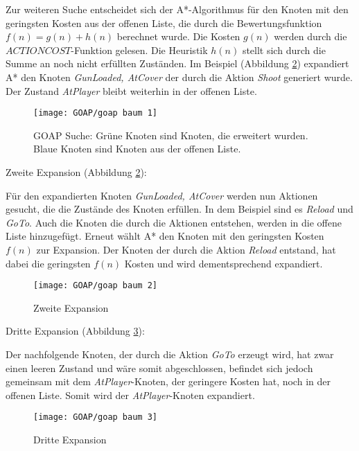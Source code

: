 Zur weiteren Suche entscheidet sich der A*-Algorithmus f\"{u}r den Knoten mit den geringsten Kosten aus der offenen Liste, die durch die Bewertungsfunktion $f(n) = g(n) + h(n)$ berechnet wurde. Die Kosten $g(n)$ werden durch die $\textit{ACTIONCOST}$-Funktion gelesen. Die Heuristik $h(n)$ stellt sich durch die Summe an noch nicht erf\"{u}llten Zust\"{a}nden. Im Beispiel (Abbildung \ref{fig:goap2}) expandiert A* den Knoten \textit{GunLoaded, AtCover} der durch die Aktion \textit{Shoot} generiert wurde. Der Zustand \textit{AtPlayer} bleibt weiterhin in der offenen Liste.


\begin{figure}[h]
  \centering
  \texttt{[image: GOAP/goap baum 1]}
	\captionsetup{justification=justified, format=plain}
  \caption{GOAP Suche: Gr\"{u}ne Knoten sind Knoten, die erweitert wurden. Blaue Knoten sind Knoten aus der offenen Liste.}
  \label{fig:goap1}
\end{figure}

\clearpage

Zweite Expansion (Abbildung \ref{fig:goap2}):

F\"{u}r den expandierten Knoten \textit{GunLoaded, AtCover} werden nun Aktionen gesucht, die die Zust\"{a}nde des Knoten erf\"{u}llen. In dem Beispiel sind es \textit{Reload} und \textit{GoTo}. Auch die Knoten die durch die Aktionen entstehen, werden in die offene Liste hinzugef\"{u}gt. Erneut w\"{a}hlt A* den Knoten mit den geringsten Kosten $f(n)$ zur Expansion. Der Knoten der durch die Aktion \textit{Reload} entstand, hat dabei die geringsten $f(n)$ Kosten und wird dementsprechend expandiert. 


\begin{figure}[h]
  \centering
  \texttt{[image: GOAP/goap baum 2]}
	\captionsetup{justification=justified, format=plain}
  \caption{Zweite Expansion}
  \label{fig:goap2}
\end{figure}

\clearpage 

Dritte Expansion (Abbildung \ref{fig:goap3}):

Der nachfolgende Knoten, der durch die Aktion \textit{GoTo} erzeugt wird, hat zwar einen leeren Zustand und w\"{a}re somit abgeschlossen, befindet sich jedoch gemeinsam mit dem \textit{AtPlayer}-Knoten, der geringere Kosten hat, noch in der offenen Liste. Somit wird der \textit{AtPlayer}-Knoten expandiert.

\begin{figure}[h]
  \centering
  \texttt{[image: GOAP/goap baum 3]}
	\captionsetup{justification=justified, format=plain}
  \caption{Dritte Expansion}
  \label{fig:goap3}
\end{figure}

